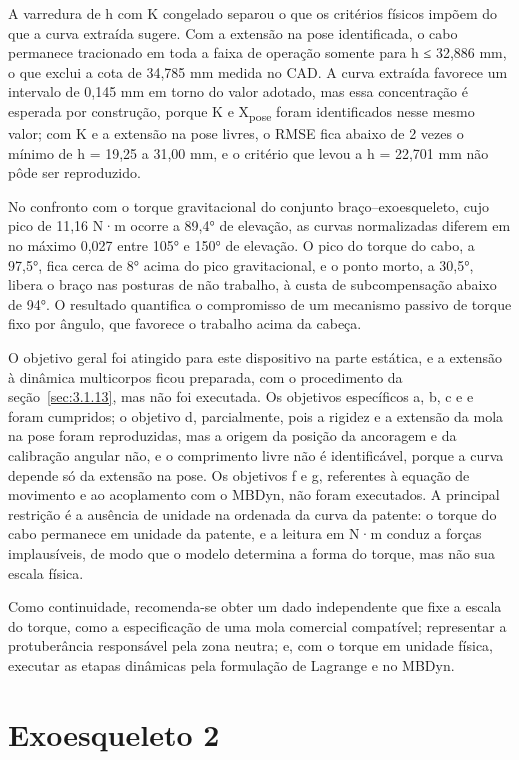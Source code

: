 A varredura de h com K congelado separou o que os critérios físicos impõem do que a curva extraída sugere. Com a extensão na pose identificada, o cabo permanece tracionado em toda a faixa de operação somente para h ≤ 32,886 mm, o que exclui a cota de 34,785 mm medida no CAD. A curva extraída favorece um intervalo de 0,145 mm em torno do valor adotado, mas essa concentração é esperada por construção, porque K e X\textsubscript{pose} foram identificados nesse mesmo valor; com K e a extensão na pose livres, o RMSE fica abaixo de 2 vezes o mínimo de h = 19,25 a 31,00 mm, e o critério que levou a h = 22,701 mm não pôde ser reproduzido.

No confronto com o torque gravitacional do conjunto braço–exoesqueleto, cujo pico de 11,16 N·m ocorre a 89,4° de elevação, as curvas normalizadas diferem em no máximo 0,027 entre 105° e 150° de elevação. O pico do torque do cabo, a 97,5°, fica cerca de 8° acima do pico gravitacional, e o ponto morto, a 30,5°, libera o braço nas posturas de não trabalho, à custa de subcompensação abaixo de 94°. O resultado quantifica o compromisso de um mecanismo passivo de torque fixo por ângulo, que favorece o trabalho acima da cabeça.

O objetivo geral foi atingido para este dispositivo na parte estática, e a extensão à dinâmica multicorpos ficou preparada, com o procedimento da seção~\ref{sec:3.1.13}, mas não foi executada. Os objetivos específicos a, b, c e e foram cumpridos; o objetivo d, parcialmente, pois a rigidez e a extensão da mola na pose foram reproduzidas, mas a origem da posição da ancoragem e da calibração angular não, e o comprimento livre não é identificável, porque a curva depende só da extensão na pose. Os objetivos f e g, referentes à equação de movimento e ao acoplamento com o MBDyn, não foram executados. A principal restrição é a ausência de unidade na ordenada da curva da patente: o torque do cabo permanece em unidade da patente, e a leitura em N·m conduz a forças implausíveis, de modo que o modelo determina a forma do torque, mas não sua escala física.

Como continuidade, recomenda-se obter um dado independente que fixe a escala do torque, como a especificação de uma mola comercial compatível; representar a protuberância responsável pela zona neutra; e, com o torque em unidade física, executar as etapas dinâmicas pela formulação de Lagrange e no MBDyn.

\section{Exoesqueleto 2}\label{sec:5.2}

